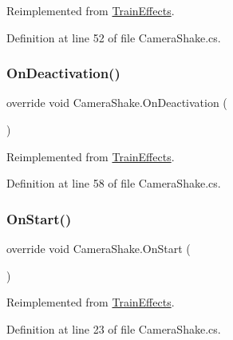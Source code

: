 Reimplemented from \mbox{\hyperlink{class_train_effects_ad77aba799a5d19a141128639a4bebcad}{Train\+Effects}}.



Definition at line 52 of file Camera\+Shake.\+cs.

\mbox{\label{class_camera_shake_a23f08ebfe2391c0f361e2944599c8bfa}} 
\subsubsection{\texorpdfstring{On\+Deactivation()}{OnDeactivation()}}
{\footnotesize\ttfamily override void Camera\+Shake.\+On\+Deactivation (\begin{DoxyParamCaption}{ }\end{DoxyParamCaption})\hspace{0.3cm}{\ttfamily [virtual]}}



Reimplemented from \mbox{\hyperlink{class_train_effects_abc55d7e7440cb7a076c7342c3cf74165}{Train\+Effects}}.



Definition at line 58 of file Camera\+Shake.\+cs.

\mbox{\label{class_camera_shake_a564408e38a410303c26ea371f9474496}} 
\subsubsection{\texorpdfstring{On\+Start()}{OnStart()}}
{\footnotesize\ttfamily override void Camera\+Shake.\+On\+Start (\begin{DoxyParamCaption}{ }\end{DoxyParamCaption})\hspace{0.3cm}{\ttfamily [virtual]}}



Reimplemented from \mbox{\hyperlink{class_train_effects_acabdc668bc9a6cf6d8d9e06fa5ccb071}{Train\+Effects}}.



Definition at line 23 of file Camera\+Shake.\+cs.

\mbox{\label{class_camera_shake_a4bc10cdc460936d634078c39db1aed3b}} 
